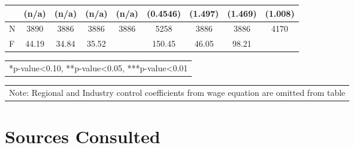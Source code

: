 \documentclass[12pt]{report}
\begin{document}
\begin{sidewaystable}
\begin{tabular}{lc|c|c|c|c|c|c|c}
& (n/a) & (n/a) & (n/a) & (n/a) & (0.4546) & (1.497) & (1.469) & (1.008)\\
\hline
N & 3890 & 3886 & 3886 & 3886 & 5258 & 3886 & 3886 & 4170\\
F & 44.19 & 34.84 & 35.52 & & 150.45 & 46.05 & 98.21 & \\
\hline
\hline
\end{tabular}
\begin{tabular}{p{6.25in}}\footnotesize{
*p-value<0.10, **p-value<0.05, ***p-value<0.01}\\
\end{tabular}
\begin{tabular}{p{6.25in}}\footnotesize{
Note: Regional and Industry control coefficients from wage equation are omitted from table}\\
\end{tabular}
\end{sidewaystable}

\begin{comment}R-sq & 0.2912 & -0.2425 & -0.2962 & 0.2803 & 0.3143 & -0.8560 & -1.7323 & -0.5777\\
\end{comment}

\newpage
\chapter*{Sources Consulted}
\begin{singlespace}
\nocite{*}


\end{singlespace}
\end{document}
